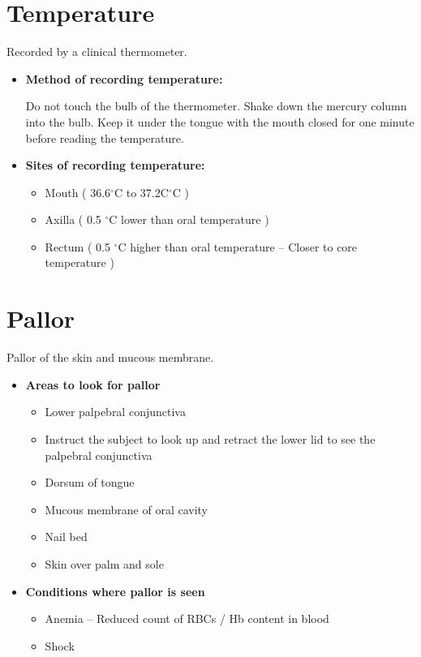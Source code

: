 \documentclass[a4paper,12pt]{book}
\begin{document}
															\section*{Temperature}
															Recorded by a clinical thermometer.\newline
															\begin{itemize}
																\item{\textbf{Method of recording temperature:}}

																	Do not touch the bulb of the thermometer. Shake down the mercury column into the bulb. Keep it under the tongue with the mouth closed for one minute before reading the temperature.
																\item{\textbf{Sites of recording temperature:}}
																	\begin{itemize}%
																		\setlength\itemsep{.5em}
																		\item{Mouth ( 36.6$^{\circ}$C to 37.2C$^{\circ}$C )}
																		\item{Axilla ( 0.5 $^{\circ}$C lower than oral temperature )}
																		\item{Rectum ( 0.5 $^{\circ}$C higher than oral temperature – Closer to core temperature )}
																	\end{itemize}
															\end{itemize}

															\section*{Pallor}
															Pallor of the skin and mucous membrane.
															\begin{itemize}
																\item{\textbf{Areas to look for pallor}}
																	\begin{itemize}
																		\item{Lower palpebral conjunctiva}
																		\item{Instruct the subject to look up and retract the lower lid to see the palpebral conjunctiva}
																		\item{Dorsum of tongue}
																		\item{Mucous membrane of oral cavity}
																		\item{Nail bed}
																		\item{Skin over palm and sole}
																	\end{itemize}

																\item{\textbf{Conditions where pallor is seen}}
																	\begin{itemize}
																		\item{Anemia – Reduced count of RBCs / Hb content in blood}
																		\item{Shock}
																	\end{itemize}
															\end{itemize}
\end{document}
